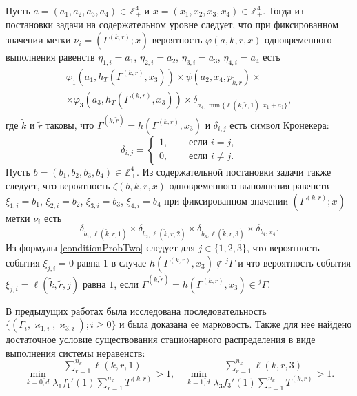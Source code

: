\documentclass[11pt]{ubs}
\begin{document}
Пусть $a=(a_1, a_2, a_3, a_4) \in \mathbb{Z}_+^4$ и $x=(x_1, x_2, x_3, x_4) \in \mathbb{Z}_+^4$. Тогда из постановки задачи на содержательном уровне следует, что при фиксированном значении метки $\nu_i=(\Gamma^{(k,r)}; x)$ вероятность $\varphi(a,k,r,x)$ одновременного выполнения равенств $\eta_{1,i}=a_1$, $\eta_{2,i}=a_2$, $\eta_{3,i}=a_3$, $\eta_{4,i}=a_4$ есть 
\begin{multline*}
\varphi_1(a_1,h_T(\Gamma^{(k,r)},x_3)) \times \psi(a_2,x_4, p_{\tilde{k},\tilde{r}}) \times \\ \times \varphi_3(a_3,h_T(\Gamma^{(k,r)},x_3))
\times \delta_{a_4,\min{\{\ell(\tilde{k},\tilde{r},1), x_1+a_1}\}},
\end{multline*}
где $\tilde{k}$ и $\tilde{r}$ таковы, что $\Gamma^{(\tilde{k},\tilde{r})}=h(\Gamma^{(k,r)},x_3)$ и $\delta_{i,j}$ есть символ Кронекера:
$$
\delta_{i,j}=
\begin{cases} 
1,& \quad \text{ если $i=j$,}\\
0,& \quad \text{ если $i\neq j$.}
\end{cases}
$$%
Пусть $b=(b_1, b_2, b_3, b_4) \in \mathbb{Z}_+^4$. Из содержательной постановки задачи также следует, что вероятность $\zeta(b, k, r, x)$ одновременного выполнения равенств $\xi_{1,i}=b_1$, $\xi_{2,i}=b_2$, $\xi_{3,i}=b_3$, $\xi_{4,i}=b_4$ при фиксированном значении $(\Gamma^{(k,r)}; x)$ метки $\nu_i$ есть
\begin{equation}
\delta_{b_1,\ell(\tilde{k},\tilde{r},1)} \times \delta_{b_2,\ell(\tilde{k},\tilde{r},2)} \times 
\delta_{b_3,\ell(\tilde{k},\tilde{r},3)} \times \delta_{b_4,x_4}.
\label{conditionProbTwo}
\end{equation}
Из формулы \eqref{conditionProbTwo} следует для $j\in \{1, 2, 3\}$, что вероятность события $\xi_{j,i}=0$ равна $1$ в случае $h(\Gamma^{(k,r)},x_3)\notin {}^j\Gamma$ и что вероятность события $\xi_{j,i}=\ell(\tilde{k},\tilde{r},j)$ равна $1$, если $\Gamma^{(\tilde{k},\tilde{r})}=h(\Gamma^{(k,r)},x_3)\in {}^j\Gamma$.






В предыдущих работах была исследована последовательность $\{(\Gamma_i, \varkappa_{1,i},\varkappa_{3,i}); i \geqslant 0\}$ и была доказана ее марковость. Также для нее найдено достаточное условие существования стационарного распределения в виде выполнения системы неравенств:
\begin{equation}
\min_{k=\overline{0,d}} { \frac{\sum_{r = 1}^{n_k} \ell(k,r,1) }{\lambda_1 f_1'(1) \sum_{r=1}^{n_k} T^{(k,r)} }}>1, \quad 
\min_{k=\overline{1,d}} { \frac{\sum_{r = 1}^{n_k} \ell(k,r,3) }{\lambda_3 f_3'(1) \sum_{r=1}^{n_k} T^{(k,r)} }}>1.
\label{sufficient:double}
\end{equation}
\end{document}
